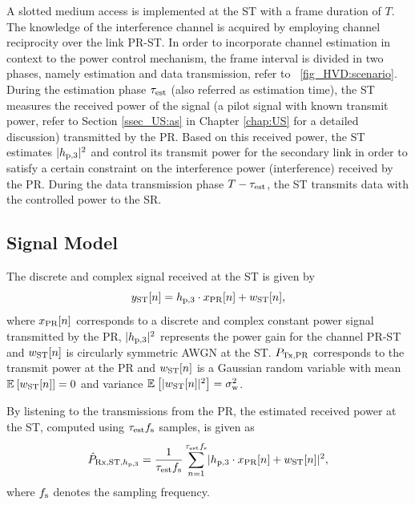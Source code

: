A slotted medium access is implemented at the ST with a frame duration of $T$. The knowledge of the interference channel is acquired by employing channel reciprocity over the link PR-ST. %
In order to incorporate channel estimation in context to the power control mechanism, the frame interval is divided in two phases, namely estimation and data transmission, refer to \figurename~\ref{fig_HVD:scenario}. During the estimation phase $\tau_{\text{est}}$ (also referred as estimation time), the ST measures the received power of the signal (a pilot signal with known transmit power, refer to Section \ref{ssec_US:as} in Chapter \ref{chap:US} for a detailed discussion) transmitted by the PR. Based on this received power, the ST estimates $|h_{\text{p,3}}|^2$ and control its transmit power for the secondary link in order to satisfy a certain constraint on the interference power (interference) received by the PR. During the data transmission phase $T-\tau_{\text{est}}$, the ST transmits data with the controlled power to the SR.

\subsection{Signal Model}
The discrete and complex signal received at the ST is given by
\begin{equation}
y_{\text{ST}}[n] = h_{\text{p,3}} \cdot x_{\text{PR}}[n] + w_{\text{ST}}[n],
\label{eq_HVD:sys_mod_st}
\end{equation}
where $x_{\text{PR}}[n]$ corresponds to a discrete and complex constant power signal transmitted by the PR, $|h_{\text{p,3}}|^2$ represents the power gain for the channel PR-ST and $w_{\text{ST}}[n]$ is circularly symmetric AWGN at the ST.
 $P_{\text{Tx,PR}}$  corresponds to the transmit power at the PR and $w_{\text{ST}}[n]$ is a Gaussian random variable with mean ${\mathbb E}_{}\left[ w_{\text{ST}}[n] \right] = 0$ and variance ${\mathbb E}_{}\left[ |w_{\text{ST}}[n]|^2 \right] = \sigma^2_{\text{w}}$. 

By listening to the transmissions from the PR, the estimated received power at the ST, computed using $\tau_{\text{est}} f_{\text{s}}$ samples, is given as
\begin{align}
\hat{P}_{\text{Rx,ST,$h_{\text{p,3}}$}} = {\frac{1}{{\tau_{\text{est}} f_{\text{s}}}}\sum_{n=1}^{\tau_{\text{est}} f_{\text{s}}}} { |h_{\text{p,3}} \cdot x_{\text{PR}}[n] + w_{\text{ST}}[n]|^2},
\label{eq_HVD:prcvd} 
\end{align}
where $f_{\text{s}}$ denotes the sampling frequency. 

